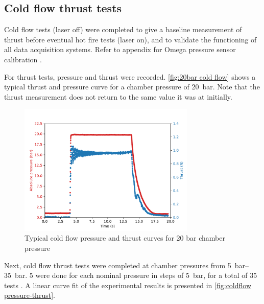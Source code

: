         \subsection{Cold flow thrust tests}

            Cold flow tests (laser off) were completed to give a baseline measurement of thrust before eventual hot fire tests (laser on), and to validate the functioning of all data acquisition systems. Refer to appendix for Omega pressure sensor calibration .

            For thrust tests, pressure and thrust were recorded. \autoref{fig:20bar cold flow} shows a typical thrust and pressure curve for a chamber pressure of \qty{20}{bar}. Note that the thrust measurement does not return to the same value it was at initially.

            \begin{figure}[!ht]
                \centering
                \includegraphics[width=0.75\textwidth]{assets/4 experiments/Example thrust 20 bar.pdf}
                \caption{Typical cold flow pressure and thrust curves for 20 bar chamber pressure}
                \label{fig:20bar cold flow}
            \end{figure}

            Next, cold flow thrust tests were completed at chamber pressures from \qtyrange{5}{35}{bar}. 5 were done for each nominal pressure in steps of \qty{5}{bar}, for a total of 35 tests . A linear curve fit of the experimental results is presented in \autoref{fig:coldflow pressure-thrust}.

